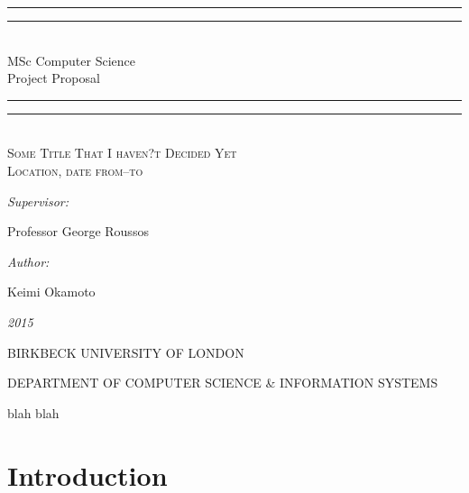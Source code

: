\documentclass[a4paper, 11pt]{article}
\newlength{\drop}
\begin{document}
  \begin{titlepage}
    \textheight
    \centering
    \vspace*{\baselineskip}
    \rule{\textwidth}{1.6pt}\vspace*{-\baselineskip}\vspace*{2pt}
    \rule{\textwidth}{0.4pt}\\[\baselineskip]
    {\Large{MSc Computer Science\\[0.3\baselineskip] }}
    {\huge{Project Proposal\\[0.3\baselineskip] }}
	
    \rule{\textwidth}{0.4pt}\vspace*{-\baselineskip}\vspace{3.2pt}
    \rule{\textwidth}{1.6pt}
    \\[\baselineskip]
    \scshape
    {\Large Some Title That I haven?t Decided Yet \\}
    Location, date from--to\par
    \vspace*{2\baselineskip}
    {\normalsize\emph{Supervisor: }{\large Professor George Roussos\par}}
    {\normalsize\emph{Author: }{\large Keimi Okamoto\par}}
    
    {\itshape 2015}
    \vfill
    {\large BIRKBECK UNIVERSITY OF LONDON\par}
{\footnotesize DEPARTMENT OF COMPUTER SCIENCE \& INFORMATION SYSTEMS}\par
  \end{titlepage}
  
\tableofcontents
\clearpage

blah blah
\clearpage

\section{Introduction}
\end{document}
